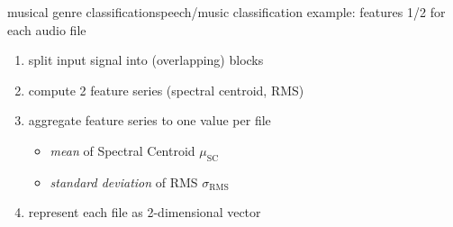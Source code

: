         \begin{frame}{musical genre classification}{speech/music classification example: features 1/2}
            for each audio file
            \begin{enumerate}
                \item<1->	split input signal into (overlapping) blocks
                \item<2->	compute 2 feature series (spectral centroid, RMS)
                \item<3->	aggregate feature series to one value per file
                    \begin{itemize}
                        \item	\textit{mean} of Spectral Centroid $\mu_\mathrm{SC}$
                        \item	\textit{standard deviation} of RMS $\sigma_\mathrm{RMS}$
                    \end{itemize}
                \item<4->	represent each file as 2-dimensional vector
            \end{enumerate}				
        \end{frame}

